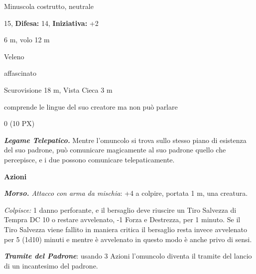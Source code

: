 \begin{multicols}{2}
{
\noindent
\begin{description}[noitemsep, topsep=0pt, parsep=0pt, partopsep=0pt, leftmargin=0cm, labelwidth=2.2cm]
	\item[\textbf{Taglia/Tipo:}] Minuscola costrutto, neutrale
	\item[\textbf{Caratt.:}] 
	\item[\textbf{Punti Ferita:}] 15,  \textbf{Difesa:} 14,  \textbf{Iniziativa:} +2
	\item[\textbf{Movimento:}] 6 m, volo 12 m
	\item[\textbf{Tiri Salvez.:}] 
	\item[\textbf{Imm. Danni:}] Veleno
	\item[\textbf{Immunità:}] affascinato
	\item[\textbf{Sensi:}] Scurovisione 18 m, Vista Cieca 3 m
	\item[\textbf{Linguaggi:}] comprende le lingue del suo creatore ma non può parlare
	\item[\textbf{Sfida:}] 0 (10 PX)\smallskip
\end{description}

\emph{\textbf{Legame Telepatico.}} Mentre l'omuncolo si trova sullo stesso piano di esistenza del suo padrone, può comunicare magicamente al suo padrone quello che percepisce, e i due possono comunicare telepaticamente.

\textbf{Azioni}

\emph{\textbf{Morso.} Attacco con arma da mischia}: +4 a colpire, portata 1 m, una creatura.

\emph{Colpisce:} 1 danno perforante, e il bersaglio deve riuscire un Tiro Salvezza di Tempra DC 10 o restare avvelenato, -1 Forza e Destrezza, per 1 minuto. Se il Tiro Salvezza viene fallito in maniera critica il bersaglio resta invece avvelenato per 5 (1d10) minuti e mentre è avvelenato in questo modo è anche privo di sensi.

\emph{\textbf{Tramite del Padrone}}: usando 3 Azioni l'omuncolo diventa il tramite del lancio di un incantesimo del padrone.

}
\end{multicols}
